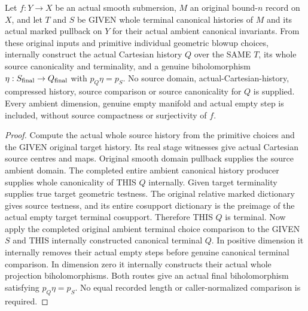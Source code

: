 \begin{theorem}
\label{hir:smooth-original-terminal-source-actual-cartesian-comparison}
\leanok
{}
Let $f:Y\to X$ be an actual smooth submersion, $M$ an original bound-$n$
record on $X$, and let $T$ and $S$ be GIVEN whole terminal canonical
histories of $M$ and its actual marked pullback on $Y$ for their actual
ambient canonical invariants. From these original inputs and primitive
individual geometric blowup choices, internally construct the actual
Cartesian history $Q$ over the SAME $T$, its whole source canonicality and
terminality, and a genuine biholomorphism $\eta:S_{\rm final}\to Q_{\rm final}$
with $p_Q\eta=p_S$. No source domain, actual-Cartesian-history, compressed
history, source comparison or source canonicality for $Q$ is supplied.
Every ambient dimension, genuine empty manifold and actual empty step is
included, without source compactness or surjectivity of $f$.
\end{theorem}
\begin{proof}
Compute the actual whole source history from the primitive choices and
the GIVEN original target history. Its real stage witnesses give actual
Cartesian source centres and maps. Original smooth domain pullback supplies
the source ambient domain. The completed entire ambient canonical history
producer supplies whole canonicality of THIS $Q$ internally. Given target
terminality supplies true target geometric testness. The original relative
marked dictionary gives source testness, and its entire cosupport dictionary
is the preimage of the actual empty target terminal cosupport. Therefore
THIS $Q$ is terminal. Now apply the completed original ambient terminal
choice comparison to the GIVEN $S$ and THIS internally constructed canonical
terminal $Q$. In positive dimension it internally removes their actual
empty steps before genuine canonical terminal comparison. In dimension
zero it internally constructs their actual whole projection biholomorphisms.
Both routes give an actual final biholomorphism satisfying $p_Q\eta=p_S$.
No equal recorded length or caller-normalized comparison is required.
\end{proof}

